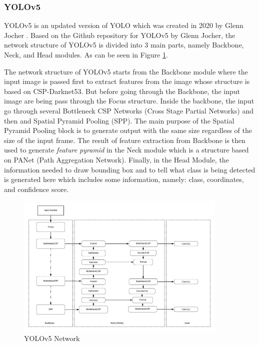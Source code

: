 \subsubsection{YOLOv5}
\label{subsecsec:yolov5}

\par YOLOv5 is an updated version of YOLO which was created in 2020 by Glenn Jocher \cite{glenn_jocher_yolov5}. Based on the Github repository for YOLOv5 by Glenn Jocher, the network structure of YOLOv5 is divided into 3 main parts, namely Backbone, Neck, and Head modules. As can be seen in Figure \ref{fig:yolov5network}. 

\par The network structure of YOLOv5 starts from the Backbone module where the input image is passed first to extract features from the image whose structure is based on CSP-Darknet53. But before going through the Backbone, the input image are being pass through the Focus structure. Inside the backbone, the input go through several  Bottleneck CSP Networks (Cross Stage Partial Networks) and then  and Spatial Pyramid Pooling (SPP). The main purpose of the Spatial Pyramid Pooling block is to generate output with the same size regardless of the size of the input frame. The result of feature extraction from Backbone is then used to generate \emph{feature pyramid} in the Neck module which is a structure based on PANet (Path Aggregation Network). Finally, in the Head Module, the information needed to draw bounding box and to tell what class is being detected is generated here which includes some information, namely: class, coordinates, and confidence score.

\begin{figure} [ht]
  \centering
  \includegraphics[width=0.9\textwidth]{gambar/yolov5 structure.png}

  \caption{YOLOv5 Network}
  \label{fig:yolov5network}
\end{figure}

